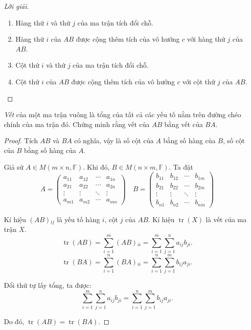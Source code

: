 \begin{proof}[Lời giải]
    \begin{enumerate}[label = (\alph*)]
        \item Hàng thứ $i$ và thứ $j$ của ma trận tích đổi chỗ.
        \item Hàng thứ $i$ của $AB$ được cộng thêm tích của vô hướng $c$ với hàng thứ $j$ của $AB$.
        \item Cột thứ $i$ và thứ $j$ của ma trận tích đổi chỗ.
        \item Cột thứ $i$ của $AB$ được cộng thêm tích của vô hướng $c$ với cột thứ $j$ của $AB$.
    \end{enumerate}
\end{proof}

\begin{exercise}\label{trace-of-products}
    \textit{Vết} của một ma trận vuông là tổng của tất cả các yếu tố nằm trên đường chéo chính của ma trận đó. Chứng minh rằng vết của $AB$ bằng vết của $BA$.
\end{exercise}

\begin{proof}
    Tích $AB$ và $BA$ có nghĩa, vậy là số cột của $A$ bằng số hàng của $B$, số cột của $B$ bằng số hàng của $A$.
    \par Giả sử $A\in M(m\times n, \mathbb{F})$. Khi đó, $B\in M(n\times m, \mathbb{F})$. Ta đặt
    \[
        A =
        \begin{pmatrix}
            a_{11} & a_{12} & \cdots & a_{1n} \\
            a_{21} & a_{22} & \cdots & a_{2n} \\
            \vdots & \vdots & \ddots & \vdots \\
            a_{m1} & a_{m2} & \cdots & a_{mn}
        \end{pmatrix}
        \quad
        B =
        \begin{pmatrix}
            b_{11} & b_{12} & \cdots & b_{1m} \\
            b_{21} & b_{22} & \cdots & b_{2m} \\
            \vdots & \vdots & \ddots & \vdots \\
            b_{n1} & b_{n2} & \cdots & b_{nm}
        \end{pmatrix}
    \]
    \par Kí hiệu $(AB){}_{ij}$ là yếu tố hàng $i$, cột $j$ của $AB$. Kí hiệu $\operatorname{tr}(X)$ là vết của ma trận $X$.
    \[
        \operatorname{tr}(AB) = \sum^{m}_{i=1}(AB){}_{ii} = \sum^{m}_{i=1}\sum^{n}_{j=1}a_{ij}b_{ji}.
    \]
    \[
        \operatorname{tr}(BA) = \sum^{n}_{i=1}(BA){}_{ii} = \sum^{n}_{i=1}\sum^{m}_{j=1}b_{ij}a_{ji}.
    \]
    \par Đổi thứ tự lấy tổng, ta được:
    \[
        \sum^{m}_{i=1}\sum^{n}_{j=1}a_{ij}b_{ji} = \sum^{n}_{i=1}\sum^{m}_{j=1}b_{ij}a_{ji}.
    \]
    \par Do đó, $\operatorname{tr}(AB) = \operatorname{tr}(BA)$.
\end{proof}

